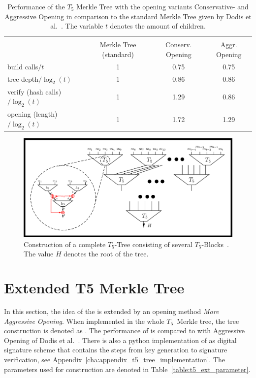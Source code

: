 \begin{table}
\centering
\begin{tabular}{l c c c} 
 \hline\noalign{\smallskip}
 \multicolumn{4}{c}{\textbf{\tftree Performance}} \\
 \noalign{\smallskip}
 & Merkle Tree (standard) & Conserv. Opening &  Aggr. Opening \\
 \hline\noalign{\smallskip}
 build calls$/t$ & 1 & 0.75 & 0.75 \\
 tree depth$/\log_2(t)$ & 1 & 0.86 & 0.86 \\
 verify (hash calls)$/\log_2(t)$ & 1 & 1.29 & 0.86 \\
 opening (length)$/\log_2(t)$ & 1 & 1.72 & 1.29 \\ 
 \hline
\end{tabular}
\caption{Performance of the $T_5$ Merkle Tree with the opening variants Conservative- and Aggressive Opening in comparison to the standard Merkle Tree given by Dodis et al.~\cite{T5_paper}. The variable $t$ denotes the amount of children.}
\label{table:t5_merkletree_dodis_performance}
\end{table}

\begin{figure}
\centering
\includegraphics[]{images/Methods/whole_tree_T5_paper.png}
\caption{Construction of a complete $T_5$-Tree consisting of several $T_5$-Blocks~\cite{T5_paper}. The value $H$ denotes the root of the tree.}
\label{img:t5_complete_tree_paper}
\end{figure}

\section{Extended T5 Merkle Tree}
\label{sec:ext_t5_tree} %
In this section, the idea of the \tftree is extended by an opening method \textit{More Aggressive Opening}. When implemented in the whole $T_5$~Merkle tree, the tree construction is denoted as \textit{\extree}.
The performance of \extree is compared to \tftree with Aggressive Opening of Dodis et al.~\cite{T5_paper}. There is also a python implementation of \extree as digital signature scheme that contains the steps from key generation to signature verification, see Appendix~\ref{cha:appendix_t5_tree_implementation}.
The parameters used for \extree construction are denoted in Table~\ref{table:t5_ext_parameter}.


